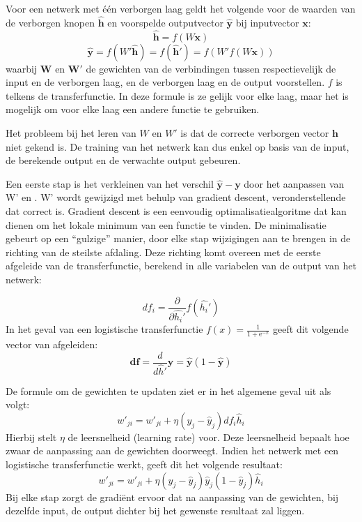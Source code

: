 Voor een netwerk met \'e\'en verborgen laag geldt het volgende voor de waarden van de verborgen knopen $\mathbf{\hat{h}}$ en voorspelde outputvector $\mathbf{\hat{y}}$ bij inputvector $\mathbf{x}$:
\begin{equation}
    \mathbf{\hat{h}} = f(W\mathbf{x})
\end{equation}
\begin{equation}
    \boldsymbol{\hat{y}} = f(W'\mathbf{\hat{h}}) = f(\boldsymbol{\hat{h}'}) = f(W'f(W\boldsymbol{x}))
\end{equation}
waarbij $\mathbf{W}$ en $\mathbf{W'}$ de gewichten van de verbindingen tussen respectievelijk de input en de verborgen laag, en de verborgen laag en de output voorstellen. $f$ is telkens de transferfunctie. In deze formule is ze gelijk voor elke laag, maar het is mogelijk om voor elke laag een andere functie te gebruiken.

Het probleem bij het leren van ${W}$ en ${W'}$ is dat de correcte verborgen vector $\mathbf{h}$ niet gekend is. De training van het netwerk kan dus enkel op basis van de input, de  berekende output en de verwachte output gebeuren.

Een eerste stap is het verkleinen van het verschil $\mathbf{\hat{y}} - \mathbf{y}$ door het aanpassen van {W'} en . {W'} wordt gewijzigd met behulp van gradient descent, veronderstellende dat  correct is. Gradient descent is een eenvoudig optimalisatiealgoritme dat kan dienen om het lokale minimum van een functie te vinden. De minimalisatie gebeurt op een ``gulzige'' manier, door elke stap wijzigingen aan te brengen in de richting van de steilste afdaling. Deze richting komt overeen met de eerste afgeleide van de transferfunctie, berekend in alle variabelen van de output van het netwerk:

\begin{equation}
df_i = \frac{\partial}{\partial\hat{h_i}'}f(\hat{h_i}')
\end{equation}
In het geval van een logistische transferfunctie $f(x) = \frac{1}{1 + \mathrm e^{-x}}$ geeft dit volgende vector van afgeleiden:
\begin{equation}
  \mathbf{df} = \frac{d}{d\hat{h}'}\mathbf{\hat{y}} = \mathbf{\hat{y}}(1-\mathbf{\hat{y}})
\end{equation}

De formule om de gewichten te updaten ziet er in het algemene geval uit als volgt:
\begin{equation}
  w'_{ji} = w'_{ji} + \eta(y_j-\hat{y}_j)df_i\hat{h}_i
\end{equation}
Hierbij stelt $\eta$ de leersnelheid (learning rate) voor. Deze leersnelheid bepaalt hoe zwaar de aanpassing aan de gewichten doorweegt.
Indien het netwerk met een logistische transferfunctie werkt, geeft dit het volgende resultaat:
\begin{equation}
    w'_{ji} = w'_{ji} + \eta(y_j-\hat{y}_j)\hat{y}_j(1-\hat{y}_j)\hat{h}_i
\end{equation}
Bij elke stap zorgt de gradi\"ent ervoor dat na aanpassing van de gewichten, bij dezelfde input, de output dichter bij het gewenste resultaat zal liggen.


